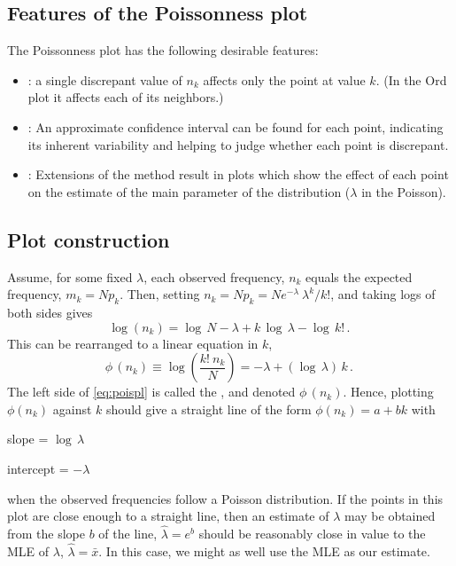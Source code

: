 \documentclass[10pt,krantz2]{krantz}\usepackage[]{graphicx}\usepackage[]{color}
\begin{document}
\subsection{Features of the Poissonness plot}
The Poissonness plot has the following desirable features:
\begin{itemize}
\item {}: a single discrepant value of \(n_k\)
       affects only the point at value \(k\).  (In the Ord plot
       it affects each of its neighbors.)
\item {}:  An approximate confidence
       interval can be found for each point, indicating its inherent
       variability and helping to judge whether each point is
       discrepant.
\item {}:  Extensions of the method result in
       plots which show the effect of each point on the estimate of
       the main parameter of the distribution (\(\lambda\) in the
       Poisson).
\end{itemize}

\subsection{Plot construction}
Assume, for some fixed \(\lambda\), each observed frequency, \(n_k\)
equals the expected frequency, \(m_k = N p_k\).  Then, setting
\(n_k = N p_k  = N { e^{ - \lambda } \:  \lambda^k } /  { k ! }\),
and taking logs of both sides gives
\begin{equation*}
  \log ( n_k ) = \log \,  N - \lambda  +  k \,  \log \,  \lambda  -
  \log \,  k !
  \period
\end{equation*}
This can be rearranged to a linear equation in $k$,
\begin{equation} \label{eq:poispl}
  \phi \,  ( n_k ) \equiv \log \left(  \frac{ k ! \:  n_k } {N} \right)
 = - \lambda  +  ( \log \,  \lambda ) \,  k
 \period
\end{equation}
The left side of \eqref{eq:poispl} is called the , and
denoted \(\phi \,  ( n_k )\).  Hence,
plotting \(\phi ( n_k )\) against \(k\) should give a straight line of the form
\(\phi ( n_k )= a + b k\) with
\begin{itemize*}
\item slope = \(\log  \,  \lambda\)
\item intercept = \(- \lambda\)
\end{itemize*}
when the observed frequencies follow a Poisson distribution.
If the points in this plot are close enough to a straight line,
then an estimate of $\lambda$ may be obtained from the slope $b$ of the line,
$\hat{\lambda} = e^b$ should be reasonably close in value
to the MLE of $\lambda$, $\hat{\lambda} = \bar{x}$.
In this case, we might as well use the MLE as our estimate.
\end{document}

